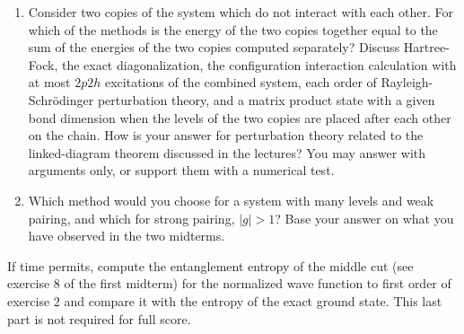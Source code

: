 \documentclass[prc]{revtex4}
\begin{document}
\begin{enumerate}
\begin{enumerate}
  in the perturbation, the number of Slater determinants, the bond
  dimension $\chi$), and how does the computational cost grow with the
  number of levels and particles when this quantity is increased? Is
  the accuracy guaranteed to improve when it is increased?
\item Consider two copies of the system which do not interact with
  each other. For which of the methods is the energy of the two
  copies together equal to the sum of the energies of the two copies
  computed separately? Discuss Hartree-Fock, the exact
  diagonalization, the configuration interaction calculation with at
  most $2p2h$ excitations of the combined system, each order of
  Rayleigh-Schr\"odinger perturbation theory, and a matrix product
  state with a given bond dimension when the levels of the two copies
  are placed after each other on the chain. How is your answer for
  perturbation theory related to the linked-diagram theorem discussed
  in the lectures? You may answer with arguments only, or support
  them with a numerical test.
\item Which method would you choose for a system with many levels and
  weak pairing, and which for strong pairing, $|g|>1$? Base your
  answer on what you have observed in the two midterms.
\end{enumerate}

If time permits, compute the entanglement entropy of the middle cut
(see exercise 8 of the first midterm) for the normalized wave function
to first order of exercise 2 and compare it with the entropy of the
exact ground state. This last part is not required for full score.

\end{enumerate}



 
\end{document}
